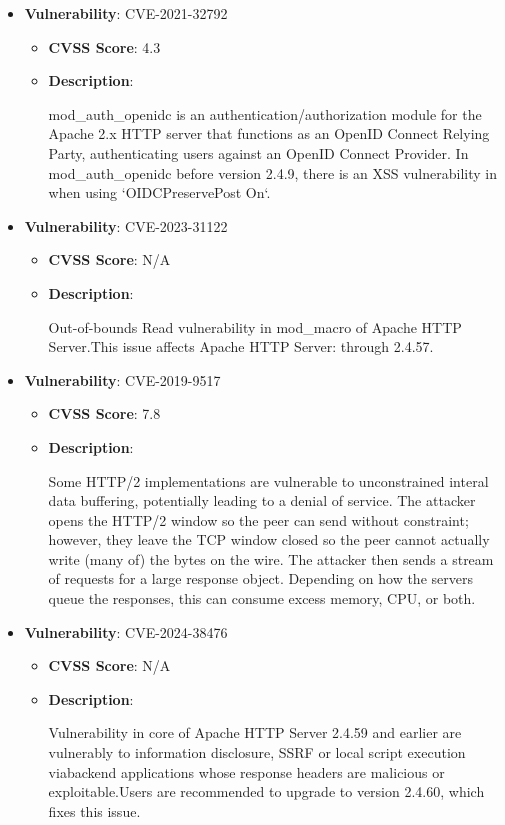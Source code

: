\documentclass{article}
\begin{document}
\begin{itemize}
        \item \textbf{Vulnerability}: CVE-2021-32792
        \begin{itemize}
            \item \textbf{CVSS Score}:  4.3 
            \item \textbf{Description}:
            \parbox[t]{0.9\linewidth}{
                \ttfamily mod\_auth\_openidc is an authentication/authorization module for the Apache 2.x HTTP server that functions as an OpenID Connect Relying Party, authenticating users against an OpenID Connect Provider. In mod\_auth\_openidc before version 2.4.9, there is an XSS vulnerability in when using `OIDCPreservePost On`.
            }
        \end{itemize}
    
        \item \textbf{Vulnerability}: CVE-2023-31122
        \begin{itemize}
            \item \textbf{CVSS Score}:  N/A 
            \item \textbf{Description}:
            \parbox[t]{0.9\linewidth}{
                \ttfamily Out-of-bounds Read vulnerability in mod\_macro of Apache HTTP Server.This issue affects Apache HTTP Server: through 2.4.57.
            }
        \end{itemize}
    
        \item \textbf{Vulnerability}: CVE-2019-9517
        \begin{itemize}
            \item \textbf{CVSS Score}:  7.8 
            \item \textbf{Description}:
            \parbox[t]{0.9\linewidth}{
                \ttfamily Some HTTP/2 implementations are vulnerable to unconstrained interal data buffering, potentially leading to a denial of service. The attacker opens the HTTP/2 window so the peer can send without constraint; however, they leave the TCP window closed so the peer cannot actually write (many of) the bytes on the wire. The attacker then sends a stream of requests for a large response object. Depending on how the servers queue the responses, this can consume excess memory, CPU, or both.
            }
        \end{itemize}
    
        \item \textbf{Vulnerability}: CVE-2024-38476
        \begin{itemize}
            \item \textbf{CVSS Score}:  N/A 
            \item \textbf{Description}:
            \parbox[t]{0.9\linewidth}{
                \ttfamily Vulnerability in core of Apache HTTP Server 2.4.59 and earlier are vulnerably to information disclosure, SSRF or local script execution viabackend applications whose response headers are malicious or exploitable.Users are recommended to upgrade to version 2.4.60, which fixes this issue.
            }
        \end{itemize}
    

\end{itemize}
\end{document}
